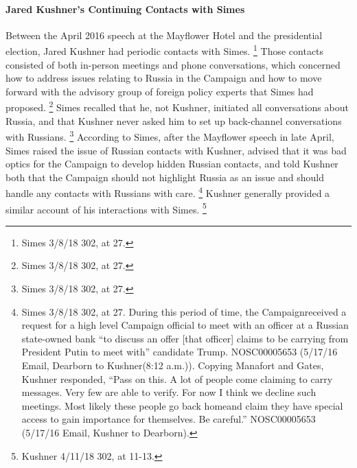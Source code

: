 \paragraph{Jared Kushner's Continuing Contacts with Simes}

Between the April 2016 speech at the Mayflower Hotel and the presidential election, Jared Kushner had periodic contacts with Simes.%
\footnote{Simes 3/8/18 302, at 27.}
Those contacts consisted of both in-person meetings and phone conversations, which concerned how to address issues relating to Russia in the Campaign and how to move forward with the advisory group of foreign policy experts that Simes had proposed.%
\footnote{Simes 3/8/18 302, at 27.}
Simes recalled that he, not Kushner, initiated all conversations about Russia, and that Kushner never asked him to set up back-channel conversations with Russians.%
\footnote{Simes 3/8/18 302, at 27.}
According to Simes, after the Mayflower speech in late April, Simes raised the issue of Russian contacts with Kushner, advised that it was bad optics for the Campaign to develop hidden Russian contacts, and told Kushner both that the Campaign should not highlight Russia as an issue and should handle any contacts with Russians with care.%
\footnote{Simes 3/8/18 302, at 27.
During this period of time, the Campaignreceived a request for a high level Campaign official to meet with an officer at a Russian state-owned bank “to discuss an offer [that officer] claims to be carrying from President Putin to meet with” candidate Trump.
NOSC00005653 (5/17/16 Email, Dearborn to Kushner(8:12 a.m.)).
Copying Manafort and Gates, Kushner responded, “Pass on this.
A lot of people come claiming to carry messages.
Very few are able to verify.
For now I think we decline such meetings.
Most likely these people go back homeand claim they have special access to gain importance for themselves.
Be careful.”
NOSC00005653 (5/17/16 Email, Kushner to Dearborn).}
Kushner generally provided a similar account of his interactions with Simes.%
\footnote{Kushner 4/11/18 302, at 11-13.}

